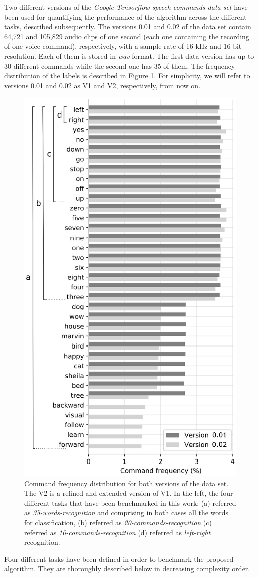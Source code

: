 Two different versions of the \textit{Google Tensorflow speech commands data set} have been used for quantifying the performance of the algorithm across the different tasks, described subsequently. The versions 0.01 and 0.02 of the data set contain 64,721 and 105,829 audio clips of one second (each one containing the recording of one voice command), respectively, with a sample rate of 16 kHz and 16-bit resolution. Each of them is stored in \textit{wav} format. The first data version has up to 30 different commands while the second one has 35 of them. The frequency distribution of the labels is described in Figure \ref{fig:freqdistdata}. For simplicity, we will refer to versions 0.01 and 0.02 as V1 and V2, respectively, from now on.


\begin{figure}[ht]
	\centering
	\includegraphics[width=0.45\linewidth]{kws/images/freqdist_data}
	\caption{Command frequency distribution for both versions of the data set. The V2 is a refined and extended version of V1. In the left, the four different tasks that have been benchmarked in this work: (a) referred as \textit{35-words-recognition} and comprising in both cases all the words for classification, (b) referred as \textit{20-commands-recognition}  (c) referred as \textit{10-commands-recognition} (d) referred as \textit{left-right} recognition.}
	\label{fig:freqdistdata}
\end{figure}

Four different tasks have been defined in order to benchmark the proposed algorithm. They are thoroughly described below in decreasing complexity order.


